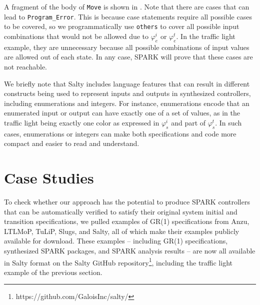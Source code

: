 \documentclass[runningheads]{llncs}
\begin{document}
A fragment of the body of \lstinline{Move} is shown in . 
Note that there are cases that can lead to \lstinline{Program_Error}. 
This is because case statements require all possible cases to be covered, so 
we programmatically use \lstinline{others} to cover all possible input combinations 
that would not be allowed due to $\varphi_e^i$ or $\varphi_e^t$. 
In the traffic light example, they are unnecessary because all possible combinations of input values are 
allowed out of each state. 
In any case, SPARK will prove that these cases are not reachable. 

We briefly note that Salty includes language features that can result in different constructs being used 
to represent inputs and outputs in synthesized controllers, 
including enumerations and integers. 
For instance, enumerations encode that an enumerated input or output can have exactly one of a set of values, 
as in the traffic light being exactly one color as expressed in $\varphi_s^i$ and part  of $\varphi_s^t$. 
In such cases, enumerations or integers can make both specifications and code more compact and easier to read and understand.

\section{Case Studies}
\label{sec:caseStudies}

To check whether our approach has the potential to produce SPARK controllers that can be automatically verified to satisfy their original system initial and transition specifications, 
we pulled examples of GR(1) specifications from Anzu, LTLMoP, TuLiP, Slugs, and Salty, all of which make their examples publicly available for download. 
These examples -- including GR(1) specifications, synthesized SPARK packages, and SPARK analysis results -- are now all available in Salty format on the 
Salty GitHub repository\footnote{https://github.com/GaloisInc/salty/}, including the traffic light example of the previous section. 
\end{document}
